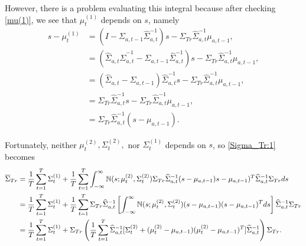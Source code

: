 \documentclass[12pt,leqno]{article}
\begin{document}
However, there is a problem evaluating this integral because after checking \eqref{mu(1)}, we see that $\mu^{(1)}_t$
depends on $s$, namely  
\begin{align*}
s - \mu^{(1)}_t &= (I - \Sigma_{a,t-1}\widehat{\Sigma}_{a,t}^{-1})s - \Sigma_{Tr}\widehat{\Sigma}_{a,t}^{-1}\mu_{a,t-1}, \\
  &= (\widehat{\Sigma}_{a,t}\widehat{\Sigma}_{a,t}^{-1} - \Sigma_{a,t-1}\widehat{\Sigma}_{a,t}^{-1})s  - 
  \Sigma_{Tr}\widehat{\Sigma}_{a,t}^{-1}\mu_{a,t-1},\\
  &= (\widehat{\Sigma}_{a,t} - \Sigma_{a,t-1})\widehat{\Sigma}_{a,t}^{-1}s - \Sigma_{Tr}\widehat{\Sigma}_{a,t}^{-1}\mu_{a,t-1},\\
  &= \Sigma_{Tr}\widehat{\Sigma}_{a,t}^{-1}s - \Sigma_{Tr}\widehat{\Sigma}_{a,t}^{-1}\mu_{a,t-1},\\
  &= \Sigma_{Tr}\widehat{\Sigma}_{a,t}^{-1}(s - \mu_{a,t-1}).
\end{align*}

Fortunately, neither $\mu^{(2)}_t,\Sigma^{(2)}_t,$ nor $\Sigma^{(1)}_t$ depends on $s$, so 
\eqref{Sigma_Tr:1} becomes
\begin{align}
  \overline{\Sigma}_{Tr} &= \frac{1}{T}\sum_{t=1}^T\Sigma^{(1)}_t + \frac{1}{T}\sum_{t=1}^T
    \int_{-\infty}^{\infty}{\mathbb N}(s;\mu^{(2)}_t,\Sigma^{(2)}_t)\Sigma_{Tr}\widehat{\Sigma}_{a,t}^{-1}(s-\mu_{a,t-1})
    s-\mu_{a,t-1})^T\widehat{\Sigma}_{a,t}^{-1}\Sigma_{Tr}ds\notag\\
    &=\frac{1}{T}\sum_{t=1}^T\Sigma^{(1)}_t +\frac{1}{T}\sum_{t=1}^T\Sigma_{Tr}\widehat{\Sigma}_{a,t}^{-1}
    \left[\int_{-\infty}^{\infty}{\mathbb N}(s;\mu^{(2)}_t,\Sigma^{(2)}_t)(s-\mu_{a,t-1})(s-\mu_{a,t-1})^Tds\right]\widehat{\Sigma}_{a,t}^{-1}\Sigma_{Tr}\notag\\
   &=\frac{1}{T}\sum_{t=1}^T\Sigma^{(1)}_t+\Sigma_{Tr}\left(\frac{1}{T}\sum_{t=1}^T\widehat{\Sigma}_{a,t}^{-1}
   [\Sigma^{(2)}_t+(\mu^{(2)}_t-\mu_{a,t-1})(\mu^{(2)}_t-\mu_{a,t-1})^T]\widehat{\Sigma}_{a,t}^{-1}\right)\Sigma_{Tr}.\label{Sigma_Tr:2}
  \end{align}
\end{document}
